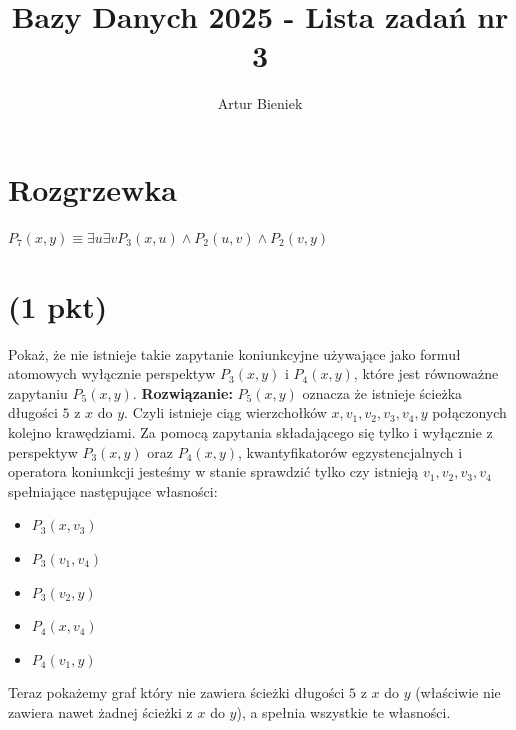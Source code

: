 \documentclass{article}
\begin{document}
\title{Bazy Danych 2025 - Lista zadań nr 3}
\author{Artur Bieniek}

\maketitle

\section*{Rozgrzewka}
$P_7(x,y) \equiv \exists u \exists v P_3(x, u) \wedge P_2(u, v) \wedge P_2(v, y)$

\section{(1 pkt)}
Pokaż, że nie istnieje takie zapytanie koniunkcyjne używające jako formuł atomowych wyłącznie perspektyw $P_3(x, y)$ i $P_4(x, y)$, które jest równoważne zapytaniu $P_5(x, y)$.
\newline \textbf{Rozwiązanie:}
$P_5(x, y)$ oznacza że istnieje ścieżka długości $5$ z $x$ do $y$. Czyli istnieje ciąg wierzchołków $x, v_1, v_2, v_3, v_4, y$ połączonych kolejno krawędziami. Za pomocą zapytania składającego się tylko i wyłącznie z perspektyw $P_3(x, y)$ oraz $P_4(x, y)$, kwantyfikatorów egzystencjalnych i operatora koniunkcji jesteśmy w stanie sprawdzić tylko czy istnieją $v_1, v_2, v_3, v_4$ spełniające następujące własności:
\begin{itemize}
        \item $P_3(x, v_3)$
        \item $P_3(v_1, v_4)$
        \item $P_3(v_2, y)$
        \item $P_4(x, v_4)$
        \item $P_4(v_1, y)$
\end{itemize}
Teraz pokażemy graf który nie zawiera ścieżki długości $5$ z $x$ do $y$ (właściwie nie zawiera nawet żadnej ścieżki z $x$ do $y$), a spełnia wszystkie te własności.
\newline
\end{document}
